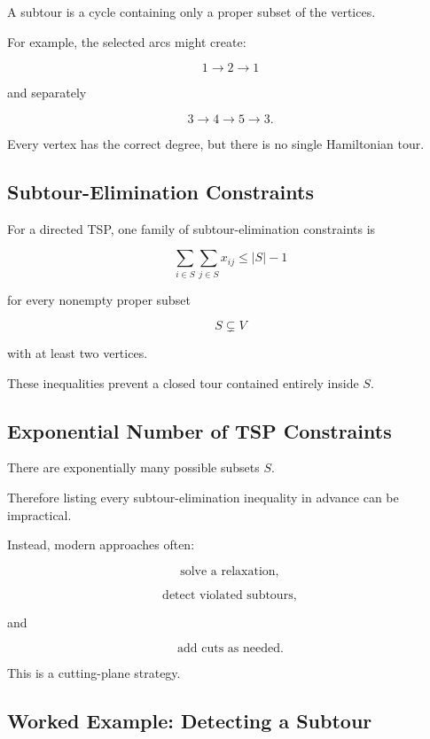A subtour is a cycle containing only a proper subset of the vertices.

For example, the selected arcs might create:

\[
\boxed{
1\to2\to1
}
\]

and separately

\[
\boxed{
3\to4\to5\to3.
}
\]

Every vertex has the correct degree, but there is no single Hamiltonian
tour.

\subsection{Subtour-Elimination Constraints}
\label{subsec:subtour-elimination}

For a directed TSP, one family of subtour-elimination constraints is

\[
\boxed{
\sum_{i\in S}
\sum_{j\in S}
x_{ij}
\leq
|S|-1
}
\]

for every nonempty proper subset

\[
S\subsetneq V
\]

with at least two vertices.

These inequalities prevent a closed tour contained entirely inside
\(S\).

\subsection{Exponential Number of TSP Constraints}
\label{subsec:tsp-exponential-constraints}

There are exponentially many possible subsets \(S\).

Therefore listing every subtour-elimination inequality in advance can be
impractical.

Instead, modern approaches often:

\[
\boxed{
\text{solve a relaxation},
}
\]

\[
\boxed{
\text{detect violated subtours},
}
\]

and

\[
\boxed{
\text{add cuts as needed}.
}
\]

This is a cutting-plane strategy.

\subsection{Worked Example: Detecting a Subtour}
\label{subsec:worked-detecting-subtour}

